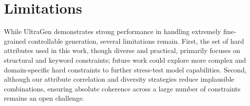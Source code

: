 \section*{Limitations}

While UltraGen demonstrates strong performance in handling extremely fine-grained controllable generation, several limitations remain. First, the set of hard attributes used in this work, though diverse and practical, primarily focuses on structural and keyword constraints; future work could explore more complex and domain-specific hard constraints to further stress-test model capabilities. Second, although our attribute correlation and diversity strategies reduce implausible combinations, ensuring absolute coherence across a large number of constraints remains an open challenge.